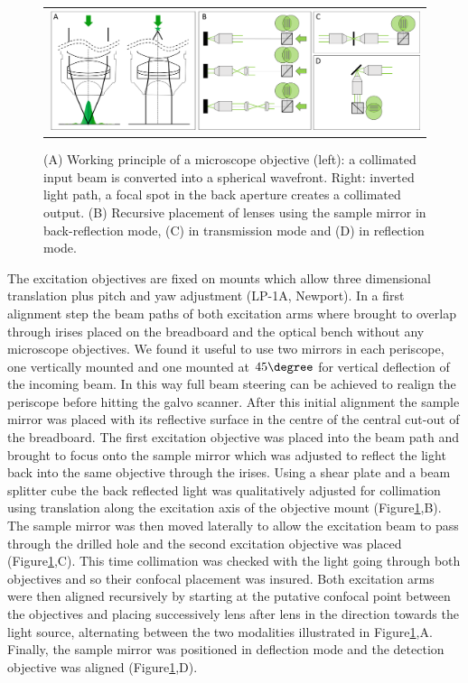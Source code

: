 \documentclass[12pt]{spieman}  %
\begin{document}
\begin{figure}
   \begin{center}
   \begin{tabular}{c}
   \includegraphics[width=\textwidth]{Panel4.eps}
   \end{tabular}
   \end{center}
   \caption{\label{fig:alignment2} (A) Working principle of a microscope objective (left): a collimated input beam is converted into a spherical wavefront. Right: inverted light path, a focal spot in the back aperture creates a collimated output. (B) Recursive placement of lenses using the sample mirror in back-reflection mode, (C) in transmission mode and (D) in reflection mode.} 
   \end{figure}

The excitation objectives are fixed on mounts which allow three dimensional translation plus pitch and yaw adjustment (LP-1A, Newport). In a first alignment step the beam paths of both excitation arms where brought to overlap through irises placed on the breadboard and the optical bench without any microscope objectives. We found it useful to use two mirrors in each periscope, one vertically mounted and one mounted at $45\degree$ for vertical deflection of the incoming beam. In this way full beam steering can be achieved to realign the periscope before hitting the galvo scanner. After this initial alignment the sample mirror was placed with its reflective surface in the centre of the central cut-out of the breadboard. The first excitation objective was placed into the beam path and brought to focus onto the sample mirror which was adjusted to reflect the light back into the same objective through the irises. Using a shear plate and a beam splitter cube the back reflected light was qualitatively adjusted for collimation using translation along the excitation axis of the objective mount (Figure\ref{fig:alignment2},B). The sample mirror was then moved laterally to allow the excitation beam to pass through the drilled hole and the second excitation objective was placed (Figure\ref{fig:alignment2},C). This time collimation was checked with the light going through both objectives and so their confocal placement was insured. Both excitation arms were then aligned recursively by starting at the putative confocal point between the objectives and placing successively lens after lens in the direction towards the light source, alternating between the two modalities illustrated in Figure\ref{fig:alignment2},A. Finally, the sample mirror was positioned in deflection mode and the detection objective was aligned (Figure\ref{fig:alignment2},D). 
\end{document}
